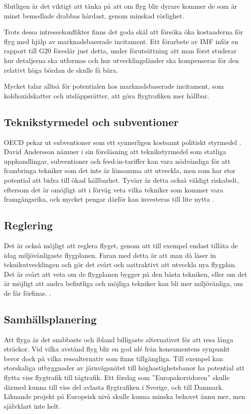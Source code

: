 \documentclass{article}
\begin{document}
Slutligen är det viktigt att tänka på att om flyg blir dyrare kommer de som är minst bemedlade drabbas hårdast, genom minskad rörlighet.

Trots dessa intressekonflikter finns det goda skäl att försöka öka kostnaderna för flyg med hjälp av marknadsbaserade incitament. Ett förarbete av IMF inför en rapport till G20  föreslår just detta, under förutsättning att man först studerar hur detaljerna ska utformas och hur utvecklingsländer ska kompenseras för den relativt höga bördan de skulle få bära.

Mycket talar alltså för potentialen hos marknadsbaserade incitament, som koldioxidskatter och utsläppsrätter, att göra flygtrafiken mer hållbar.

\subsection{Teknikstyrmedel och subventioner}

OECD pekar ut subventioner som ett synnerligen kostsamt politiskt styrmedel . David Andersson nämner i sin föreläsning att teknikstyrmedel som statliga upphandlingar, subventioner och feed-in-tariffer kan vara nödvändiga för att frambringa tekniker som det inte är lönsamma att utveckla, men som har stor potential att bidra till ökad hållbarhet. Tyvärr är detta också väldigt riskabelt, eftersom det är omöjligt att i förväg veta vilka tekniker som kommer vara framgångsrika, och mycket pengar därför kan investeras till lite nytta .

\subsection{Reglering}

Det är också möjligt att reglera flyget, genom att till exempel endast tillåta de idag miljövänligaste flygplanen. Faran med detta är att man då låser in teknikutvecklingen och gör det svårt och oattraktivt att utveckla nya flygplan. Det är svårt att veta om de flygplanen bygger på den bästa tekniken, eller om det är möjligt att andra befintliga och möjliga tekniker kan bli mer miljövänliga, om de får förfinas. .

\subsection{Samhällsplanering}

Att flyga är det snabbaste och ibland billigaste alternativet för att resa långa sträckor. Vid vilka avstånd flyg blir en god idé från konsumentens synpunkt beror dock på vilka resealternativ som finns tillgängliga. Till exempel kan storskaliga utbyggnader av järnvägsnätet till höghastighetsbanor ha potential att flytta viss flygtrafik till tågtrafik. Ett förslag som ''Europakorridoren''  skulle därmed kunna till viss del avlasta flygtrafiken i Sverige, och till Danmark. Liknande projekt på Europeisk nivå skulle kunna minska behovet ännu mer, men självklart inte helt.
\end{document}
